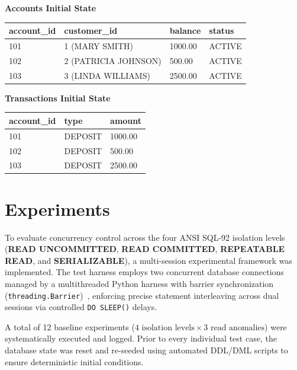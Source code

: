 \documentclass[sigconf, pbalance, nonacm]{acmart}
\begin{document}
\smallskip

\noindent\textbf{Accounts Initial State}
\smallskip

\noindent
\begin{tabularx}{\columnwidth}{XXXX}
\toprule
\textbf{account\_id} & \textbf{customer\_id} & \textbf{balance} & \textbf{status} \\
\midrule
101 & 1 (MARY SMITH) & 1000.00 & ACTIVE \\
102 & 2 (PATRICIA JOHNSON) & 500.00  & ACTIVE \\
103 & 3 (LINDA WILLIAMS) & 2500.00 & ACTIVE \\
\bottomrule
\end{tabularx}

\vspace{0.4cm} 

\noindent\textbf{Transactions Initial State}
\smallskip

\noindent
\begin{tabularx}{\columnwidth}{XXX}
\toprule
\textbf{account\_id} & \textbf{type} & \textbf{amount} \\
\midrule
101 & DEPOSIT & 1000.00 \\
102 & DEPOSIT & 500.00  \\
103 & DEPOSIT & 2500.00 \\
\bottomrule
\end{tabularx}
\vspace{0.3cm}

\section{Experiments}

To evaluate concurrency control across the four ANSI SQL-92 isolation levels (\textbf{READ UNCOMMITTED}, \textbf{READ COMMITTED}, \textbf{REPEATABLE READ}, and \textbf{SERIALIZABLE}), a multi-session experimental framework was implemented. The test harness employs two concurrent database connections managed by a multithreaded Python harness with barrier synchronization (\texttt{threading.Barrier})~\cite{PythonThreading,PyMySQL}, enforcing precise statement interleaving across dual sessions via controlled \texttt{DO SLEEP()} delays.

A total of 12 baseline experiments ($4\text{ isolation levels} \times 3\text{ read anomalies}$) were systematically executed and logged. Prior to every individual test case, the database state was reset and re-seeded using automated DDL/DML scripts to ensure deterministic initial conditions.
\end{document}
